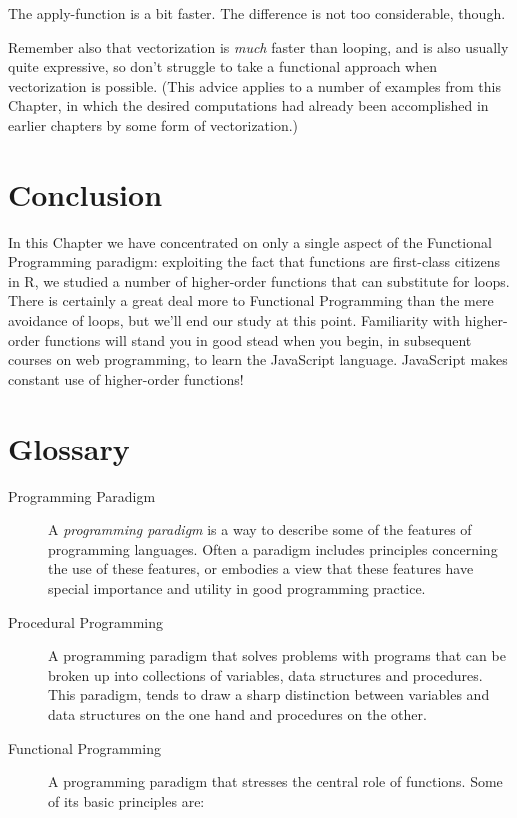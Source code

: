 \documentclass[]{book}
\theoremstyle{definition}
\theoremstyle{definition}
\theoremstyle{definition}
\theoremstyle{remark}
\begin{document}
{The apply-function is a bit faster. The difference is not too
considerable, though.

Remember also that vectorization is \emph{much} faster than looping, and
is also usually quite expressive, so don't struggle to take a functional
approach when vectorization is possible. (This advice applies to a
number of examples from this Chapter, in which the desired computations
had already been accomplished in earlier chapters by some form of
vectorization.)

\section{Conclusion}\label{conclusion}

In this Chapter we have concentrated on only a single aspect of the
Functional Programming paradigm: exploiting the fact that functions are
first-class citizens in R, we studied a number of higher-order functions
that can substitute for loops. There is certainly a great deal more to
Functional Programming than the mere avoidance of loops, but we'll end
our study at this point. Familiarity with higher-order functions will
stand you in good stead when you begin, in subsequent courses on web
programming, to learn the JavaScript language. JavaScript makes constant
use of higher-order functions!

\newpage

\section*{Glossary}\label{glossary-11}

\begin{description}
\item[Programming Paradigm ]
A \emph{programming paradigm} is a way to describe some of the features
of programming languages. Often a paradigm includes principles
concerning the use of these features, or embodies a view that these
features have special importance and utility in good programming
practice.
\item[Procedural Programming ]
A programming paradigm that solves problems with programs that can be
broken up into collections of variables, data structures and procedures.
This paradigm, tends to draw a sharp distinction between variables and
data structures on the one hand and procedures on the other.
\item[Functional Programming ]
A programming paradigm that stresses the central role of functions. Some
of its basic principles are:


\end{description}}
\end{document}
